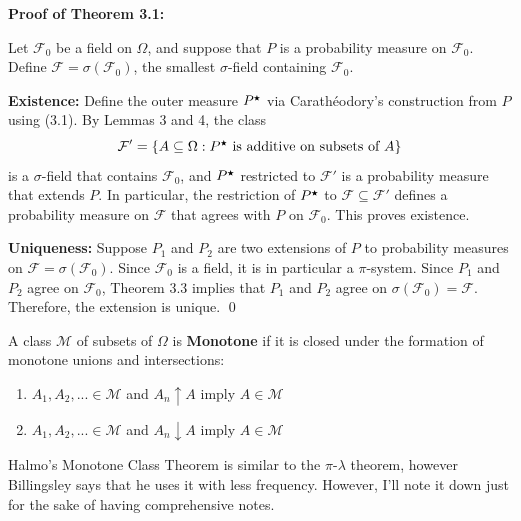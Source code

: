     \textbf{Proof of Theorem 3.1: }
    \vspace{-1ex}
    \begin{proofline}
    Let \( \mathcal{F}_0 \) be a field on \( \Omega \), and suppose that \( P \) is a probability measure on \( \mathcal{F}_0 \). Define \( \mathcal{F} = \sigma(\mathcal{F}_0) \), the smallest $\sigma$-field containing \( \mathcal{F}_0 \).

    \vspace{0.5ex}
    \textbf{Existence:} Define the outer measure \( P^{\medstar} \) via Carathéodory’s construction from \( P \) using (3.1). By Lemmas 3 and 4, the class
    \[
        \mathcal{F}' = \{ A \subseteq \Omega : \text{$P^{\medstar}$ is additive on subsets of } A \}
    \]
    is a $\sigma$-field that contains \( \mathcal{F}_0 \), and \( P^{\medstar} \) restricted to \( \mathcal{F}' \) is a probability measure that extends \( P \). In particular, the restriction of \( P^{\medstar} \) to \( \mathcal{F} \subseteq \mathcal{F}' \) defines a probability measure on \( \mathcal{F} \) that agrees with \( P \) on \( \mathcal{F}_0 \). This proves existence.

    
    \textbf{Uniqueness:} Suppose \( P_1 \) and \( P_2 \) are two extensions of \( P \) to probability measures on \( \mathcal{F} = \sigma(\mathcal{F}_0) \). Since \( \mathcal{F}_0 \) is a field, it is in particular a $\pi$-system. Since \( P_1 \) and \( P_2 \) agree on \( \mathcal{F}_0 \), Theorem 3.3 implies that \( P_1 \) and \( P_2 \) agree on \( \sigma(\mathcal{F}_0) = \mathcal{F} \). Therefore, the extension is unique. \hfill \qed
    \end{proofline}

\quad

A class $\mathcal{M}$ of subsets of $\Omega$ is \textbf{Monotone} if it is closed under the formation of monotone unions and intersections:

    \begin{enumerate}[label=\textbf{\roman*.}, topsep=0pt, itemsep=-3pt]
        \item $A_1,A_2,... \in \mathcal{M}$ and $A_n \uparrow A$ imply $A \in \mathcal{M}$
        \item $A_1,A_2,... \in \mathcal{M}$ and $A_n \downarrow A$ imply $A \in \mathcal{M}$
    \end{enumerate}

    Halmo's Monotone Class Theorem is similar to the $\pi$-$\lambda$ theorem, however Billingsley says that he uses it with less frequency. However, I'll note it down just for the sake of having comprehensive notes.\\[5pt]

